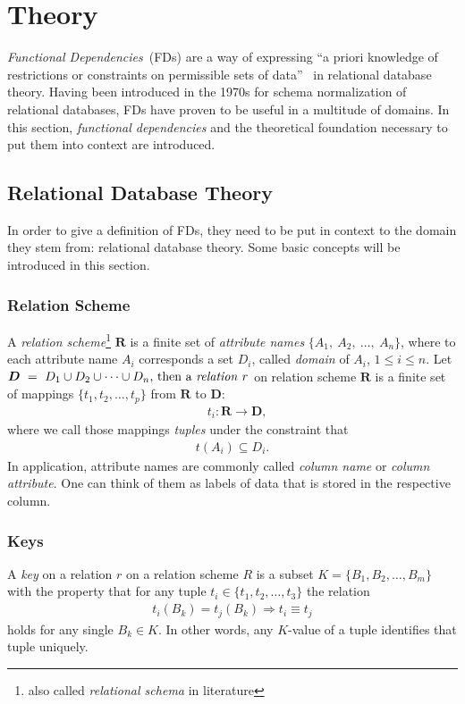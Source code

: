 \newpage
\section{Theory}
\emph{Functional Dependencies}~(FDs) are a way of expressing ``a priori knowledge of restrictions or constraints on permissible sets of data''~\cite[p.~42]{MAI83} in relational database theory.
Having been introduced in the 1970s for schema normalization of relational databases, FDs have proven to be useful in a multitude of domains. In this section, \emph{functional dependencies} and the theoretical foundation necessary to put them into context are introduced.

\subsection{Relational Database Theory}
In order to give a definition of FDs, they need to be put in context to the domain they stem from: relational database theory. Some basic concepts will be introduced in this section.

\subsubsection{Relation Scheme}
A \emph{relation scheme}\footnote{also called \emph{relational schema} in literature\cite[p.21]{ABE19} } \(\boldsymbol{R}\) is a finite set of \emph{attribute names} \(\{A_1,~A_2,~\dots,~A_n\}\), where to each attribute name \(A_i\) corresponds a set \(D_i\), called \emph{domain} of \(A_i\), \(1 \leq i \leq n\).
Let \(\boldsymbol{D}~=~D_1 \cup D_2 \cup \dots \cup D_n$, then a \emph{relation} \(r\) on relation scheme \(\boldsymbol{R}\) is a finite set of mappings \(\{t_1, t_2, \dots, t_p\}\) from \(\boldsymbol{R}\) to \(\boldsymbol{D}\):
\begin{align*}
  &t_i: \boldsymbol{R} \to \boldsymbol{D},
\end{align*}
where we call those mappings \emph{tuples} under the constraint that~\cite[p.2]{MAI83}
\begin{align*}
    t(A_i) \subseteq D_i.
\end{align*}
In application, attribute names are commonly called \emph{column name} or \emph{column attribute}.
One can think of them as labels of data that is stored in the respective column.


\subsubsection{Keys}
A \emph{key} on a relation \( r \) on a relation scheme \( R \) is a subset \( K = \{ B_1, B_2, \dots, B_m \} \) with the property that for any tuple \( t_i \in \{ t_1, t_2, \dots, t_3 \} \) the relation
\begin{align*}
    t_i(B_k) = t_j(B_k) \Rightarrow t_i \equiv t_j
\end{align*}
holds for any single \( B_k \in K \). In other words, any \( K \)-value of a tuple identifies that tuple uniquely.~\cite[p.~4]{MAI83}

